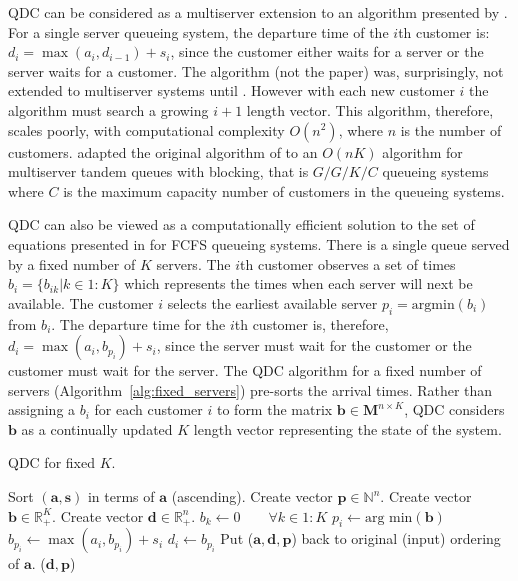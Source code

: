 \documentclass[article]{jss}
\begin{document}
QDC can be considered as a multiserver extension to an algorithm
presented by \citet{lindley_theory_1952}. For a single server queueing
system, the departure time of the $i$th customer is:
$d_i = \max{(a_i, d_{i-1})} + s_i$, since the customer either waits
for a server or the server waits for a customer. The algorithm (not
the paper) was, surprisingly, not extended to multiserver systems
until \citet{krivulin_recursive_1994}. However with each new customer
$i$ the algorithm must search a growing $i+1$ length vector. This
algorithm, therefore, scales poorly, with computational complexity
$O(n^2)$, where $n$ is the number of
customers. \citet{kin_generalized_2010} adapted the original algorithm
of \citet{kiefer_theory_1955} to an $O(nK)$ algorithm for multiserver
tandem queues with blocking, that is $G/G/K/C$ queueing systems where
$C$ is the maximum capacity number of customers in the queueing
systems.

QDC can also be viewed as a computationally efficient solution to the
set of equations presented in \citet[p.~259]{sutton_bayesian_2011} for
FCFS queueing systems. There is a single queue served by a fixed
number of $K$ servers. The $i$th customer observes a set of times
$b_i = \{ b_{ik} | k \in 1:K \}$ which represents the times when each
server will next be available. The customer $i$ selects the earliest
available server $p_i = \text{argmin}(b_i)$ from $b_i$. The departure
time for the $i$th customer is, therefore,
$d_i = \max({a_i, b_{p_i}}) + s_i$, since the server must wait for the
customer or the customer must wait for the server. The QDC algorithm
for a fixed number of servers (Algorithm~\ref{alg:fixed_servers})
pre-sorts the arrival times. Rather than assigning a $b_i$ for each
customer $i$ to form the matrix
$\mathbf{b} \in \mathbf{M}^{n \times K}$, QDC considers $\mathbf{b}$
as a continually updated $K$ length vector representing the state of
the system.

\begin{algorithm}[t!]
\caption{QDC for fixed $K$.}
\label{alg:fixed_servers}
\begin{algorithmic}[1]
\State Sort $(\mathbf{a}, \mathbf{s})$ in terms of $\mathbf{a}$ (ascending).
\State Create vector $\mathbf{p} \in \mathbb{N}^{n}$.
\State Create vector $\mathbf{b} \in \mathbb{R}_{+}^{K}$. 
\State Create vector $\mathbf{d} \in \mathbb{R}_{+}^{n}$.
\State $b_k \leftarrow 0 \quad \quad \forall k \in 1:K $
  \State $p_i \leftarrow \text{arg min}(\mathbf{b}) $ \label{alg_line:search}
  \State $b_{p_i} \leftarrow \max(a_i, b_{p_i}) + s_i $
  \State $d_i \leftarrow b_{p_i}$ 
\EndFor 
\State Put ($\mathbf{a}, \mathbf{d}, \mathbf{p}$) back to original (input) ordering of $\mathbf{a}$.
\State \Return ($\mathbf{d}, \mathbf{p}$)
\EndFunction
\end{algorithmic}
\end{algorithm}
\end{document}
